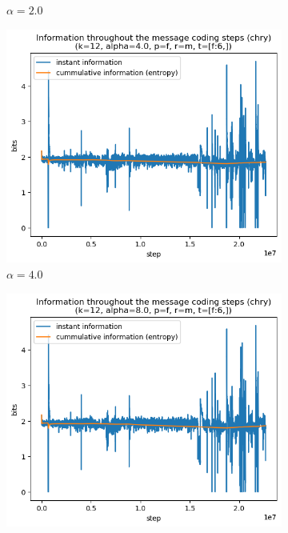 \documentclass{article}
\begin{document}
\begin{figure}
\begin{subfigure}[b]{0.3\textwidth}
\begin{center}
        \end{center}
        \caption{$\alpha = 2.0$}
        \label{fig:results-alpha-2.0}
    \end{subfigure}
    \hfill
    \begin{subfigure}[b]{0.3\textwidth}
        \begin{center}
            \includegraphics[width=1.0\linewidth]{../scripts/images/chry_12_4.0_f_m_[f:6,].png}
        \end{center}
        \caption{$\alpha = 4.0$}
        \label{fig:results-alpha-4.0}
    \end{subfigure}
    \hfill
    \begin{subfigure}[b]{0.3\textwidth}
        \begin{center}
            \includegraphics[width=1.0\linewidth]{../scripts/images/chry_12_8.0_f_m_[f:6,].png}

\end{center}
\end{subfigure}
\end{figure}
\end{document}
